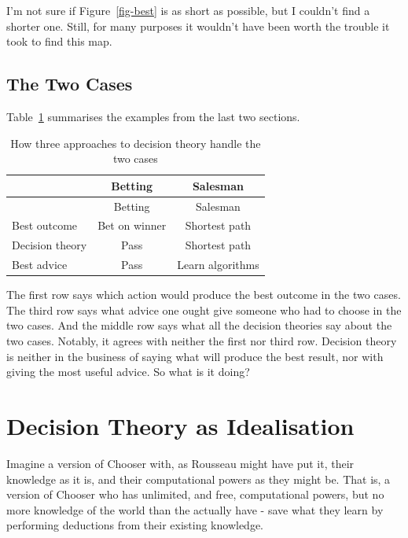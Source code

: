 \documentclass[
  11pt,
  letterpaper,
  DIV=11,
  numbers=noendperiod,
  twoside]{scrartcl}
\begin{document}
I'm not sure if Figure~\ref{fig-best} is as short as possible, but I
couldn't find a shorter one. Still, for many purposes it wouldn't have
been worth the trouble it took to find this map.

\subsection{The Two Cases}\label{the-two-cases}

Table~\ref{tbl-examples} summarises the examples from the last two
sections.

\begin{longtable}[]{@{}lcc@{}}
\caption{How three approaches to decision theory handle the two
cases}\label{tbl-examples}\tabularnewline
\toprule\noalign{}
& Betting & Salesman \\
\midrule\noalign{}
\endfirsthead
\toprule\noalign{}
& Betting & Salesman \\
\midrule\noalign{}
\endhead
\bottomrule\noalign{}
\endlastfoot
Best outcome & Bet on winner & Shortest path \\
Decision theory & Pass & Shortest path \\
Best advice & Pass & Learn algorithms \\
\end{longtable}

The first row says which action would produce the best outcome in the
two cases. The third row says what advice one ought give someone who had
to choose in the two cases. And the middle row says what all the
decision theories say about the two cases. Notably, it agrees with
neither the first nor third row. Decision theory is neither in the
business of saying what will produce the best result, nor with giving
the most useful advice. So what is it doing?

\section{Decision Theory as
Idealisation}\label{decision-theory-as-idealisation}

Imagine a version of Chooser with, as Rousseau might have put it, their
knowledge as it is, and their computational powers as they might be.
That is, a version of Chooser who has unlimited, and free, computational
powers, but no more knowledge of the world than the actually have - save
what they learn by performing deductions from their existing knowledge.
\end{document}
